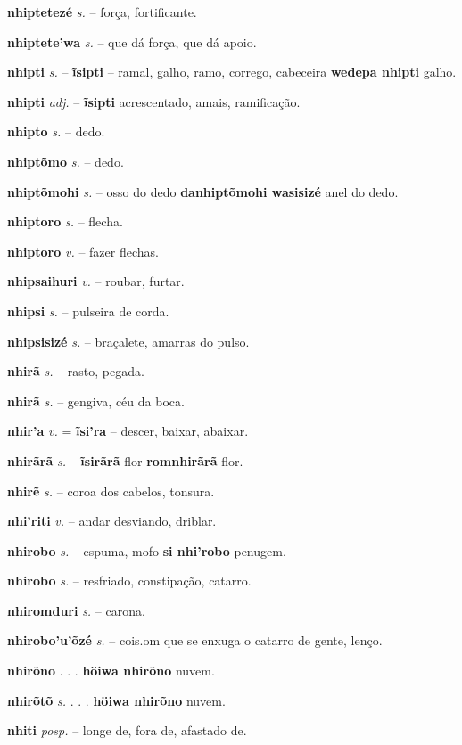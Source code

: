 \textbf{nhiptetezé} \textit{s.} -- força, fortificante.

\textbf{nhiptete'wa} \textit{s.} -- que dá força, que dá apoio.

\textbf{nhipti} \textit{s.} -- \textbf{ĩsipti} -- ramal, galho, ramo, corrego, cabeceira  \textbf{wedepa nhipti} galho.

\textbf{nhipti} \textit{adj.} -- \textbf{ĩsipti} acrescentado, amais, ramificação.

\textbf{nhipto} \textit{s.} -- dedo.

\textbf{nhiptõmo} \textit{s.} -- dedo.

\textbf{nhiptõmohi} \textit{s.} -- osso do dedo  \textbf{danhiptõmohi wasisizé} anel do dedo.

\textbf{nhiptoro} \textit{s.} -- flecha.

\textbf{nhiptoro} \textit{v.} -- fazer flechas.

\textbf{nhipsaihuri} \textit{v.} -- roubar, furtar.

\textbf{nhipsi} \textit{s.} -- pulseira de corda.

\textbf{nhipsisizé} \textit{s.} -- braçalete, amarras do pulso.

\textbf{nhirã} \textit{s.} -- rasto, pegada.

\textbf{nhirã} \textit{s.} -- gengiva, céu da boca.

\textbf{nhir'a} \textit{v.} = \textbf{ĩsi'ra} -- descer, baixar, abaixar.

\textbf{nhirãrã} \textit{s.} -- \textbf{ĩsirãrã} flor  \textbf{romnhirãrã} flor.

\textbf{nhirẽ} \textit{s.} -- coroa dos cabelos, tonsura.

\textbf{nhi'riti} \textit{v.} -- andar desviando, driblar.

\textbf{nhirobo} \textit{s.} -- espuma, mofo  \textbf{si nhi'robo} penugem.

\textbf{nhirobo} \textit{s.} -- resfriado, constipação, catarro.

\textbf{nhiromduri} \textit{s.} -- carona.

\textbf{nhirobo'u'õzé} \textit{s.} -- cois.om que se enxuga o catarro de gente, lenço.

\textbf{nhirõno} . . .  \textbf{höiwa nhirõno} nuvem.

\textbf{nhirõtõ} \textit{s.} . . .  \textbf{höiwa nhirõno} nuvem.

\textbf{nhiti} \textit{posp.} -- longe de, fora de, afastado de.

